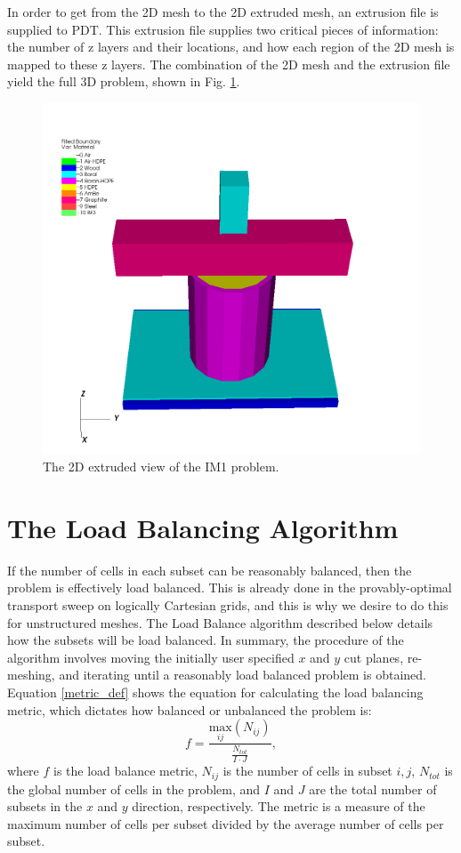 \documentclass{anstrans}
\begin{document}
In order to get from the 2D mesh to the 2D extruded mesh, an extrusion file is supplied to PDT. This extrusion file supplies two critical pieces of information: the number of z layers and their locations, and how each region of the 2D mesh is mapped to these z layers. The combination of the 2D mesh and the extrusion file yield the full 3D problem, shown in Fig. \ref{IM13D}.

\begin{figure}[H]
\centering
\includegraphics[scale = 0.3]{figures/IM1_3D.png}
\caption{The 2D extruded view of the IM1 problem.}
\label{IM13D}
\end{figure}


\section{The Load Balancing Algorithm}

If the number of cells in each subset can be reasonably balanced, then the problem is effectively load balanced. This is already done in the provably-optimal transport sweep on logically Cartesian grids, and this is why we desire to do this for unstructured meshes. The Load Balance algorithm described below details how the subsets will be load balanced. In summary, the procedure of the algorithm involves moving the initially user specified $x$ and $y$ cut planes, re-meshing, and iterating until a reasonably load balanced problem is obtained.  Equation \ref{metric_def} shows the equation for calculating the load balancing metric, which dictates how balanced or unbalanced the problem is:
\begin{equation}
f =\frac{\underset{ij}{\text{max}}(N_{ij})}{\frac{N_{tot}}{I\cdot J}},
\label{metric_def}
\end{equation}
where $f$ is the load balance metric, $N_{ij}$ is the number of cells in subset $i,j$, $N_{tot}$ is the global number of cells in the problem, and $I$ and $J$ are the total number of subsets in the $x$ and $y$ direction, respectively. The metric is a measure of the maximum number of cells per subset divided by the average number of cells per subset.
\end{document}
